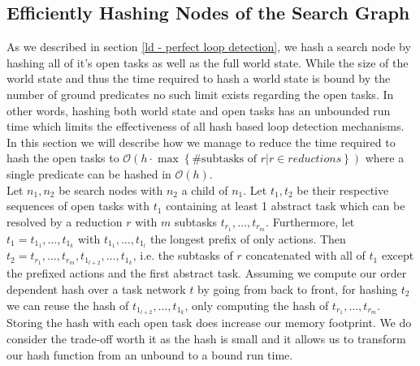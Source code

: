 \begin{comment}
\subsection{Preceding Plan}
\todo{Section no longer valid for current crowd?}
In the initial implementation each node stored the full preceding plan as a sequence of all reductions that were applied so far. This leads to roughly quadratic overhead (sum over 1..n, only roughly as not each step increases the length. Wait, is it roughly, then? Probably, as the fraction of steps that increment the preceding plan should be kinda constant)
This duplication was not needed. The newer implementation instead stores an optional<reduction> in each node. I.e., the preceding reduction is stored if one exists, nothing if there isn't one. When the preceding plan is needed, either for communication or to extract a plan, the current search path is iterated and all reductions are accumulated.
\end{comment}

\subsection{Efficiently Hashing Nodes of the Search Graph}
\label{impl: efficient hashing}
As we described in section \ref{ld - perfect loop detection}, we hash a search node by hashing all of it's open tasks as well as the full world state. While the size of the world state and thus the time required to hash a world state is bound by the number of ground predicates no such limit exists regarding the open tasks. In other words, hashing both world state and open tasks has an unbounded run time which limits the effectiveness of all hash based loop detection mechanisms. In this section we will describe how we manage to reduce the time required to hash the open tasks to $\mathcal{O}(h \cdot \max \left\{ \text{\# subtasks of } r | r \in reductions \right\})$ where a single predicate can be hashed in $\mathcal{O}(h)$. \\
Let $n_1, n_2$ be search nodes with $n_2$ a child of $n_1$. Let $t_1, t_2$ be their respective sequences of open tasks with $t_1$ containing at least 1 abstract task which can be resolved by a reduction $r$ with $m$ subtasks $t_{r_1}, \ldots, t_{r_m}$. Furthermore, let $t_1 = t_{1_1}, \ldots, t_{1_k}$ with $t_{1_1}, \ldots, t_{1_l}$ the longest prefix of only actions. Then $t_2 = t_{r_1}, \ldots, t_{r_m}, t_{1_{l+2}}, \ldots, t_{1_k}$, i.e. the subtasks of $r$ concatenated with all of $t_1$ except the prefixed actions and the first abstract task. Assuming we compute our order dependent hash over a task network $t$ by going from back to front, for hashing $t_2$ we can reuse the hash of $t_{1_{l+2}}, \ldots, t_{1_k}$, only computing the hash of $t_{r_1}, \ldots, t_{r_m}$. \\
Storing the hash with each open task does increase our memory footprint. We do consider the trade-off worth it as the hash is small and it allows us to transform our hash function from an unbound to a bound run time.

